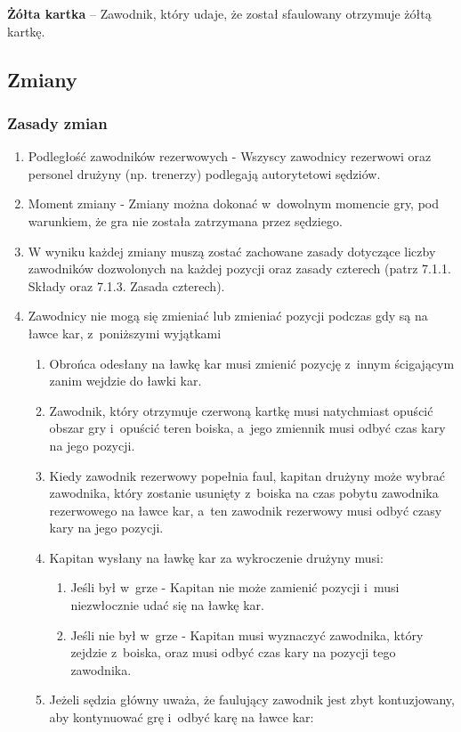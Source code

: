 \documentclass[12pt,a4paper]{article}
\newcommand\yellowcard[1]{\bgroup\textcolor{darkyellow}{\textbf{#1}}}
\begin{document}
\yellowcard{Żółta kartka} -- Zawodnik, który udaje, że został sfaulowany
otrzymuje żółtą kartkę.

\subsection{Zmiany}

\subsubsection{Zasady zmian}

\begin{enumerate}
	\item
	      Podległość zawodników rezerwowych - Wszyscy zawodnicy
	      rezerwowi oraz personel drużyny (np. trenerzy) podlegają autorytetowi
	      sędziów.
	\item
	      Moment zmiany - Zmiany można dokonać w~dowolnym momencie gry,
	      pod warunkiem, że gra nie została zatrzymana przez sędziego.
	\item
	      W wyniku każdej zmiany muszą zostać zachowane zasady dotyczące liczby
	      zawodników dozwolonych na każdej pozycji oraz zasady czterech (patrz
	      7.1.1. Składy oraz 7.1.3. Zasada czterech).
	\item
	      Zawodnicy nie mogą się zmieniać lub zmieniać pozycji podczas gdy są na
	      ławce kar, z~poniższymi wyjątkami

	      \begin{enumerate}
		      \item
		            Obrońca odesłany na ławkę kar musi zmienić pozycję z~innym
		            ścigającym zanim wejdzie do ławki kar.
		      \item
		            Zawodnik, który otrzymuje czerwoną kartkę musi natychmiast opuścić
		            obszar gry i~opuścić teren boiska, a~jego zmiennik musi odbyć czas
		            kary na jego pozycji.
		      \item
		            Kiedy zawodnik rezerwowy popełnia faul, kapitan drużyny może wybrać
		            zawodnika, który zostanie usunięty z~boiska na czas pobytu zawodnika
		            rezerwowego na ławce kar, a~ten zawodnik rezerwowy musi odbyć czasy
		            kary na jego pozycji.
		      \item
		            Kapitan wysłany na ławkę kar za wykroczenie drużyny musi:

		            \begin{enumerate}
			            \item
			                  Jeśli był w~grze - Kapitan nie może zamienić pozycji i~musi
			                  niezwłocznie udać się na ławkę kar.
			            \item
			                  Jeśli nie był w~grze - Kapitan musi wyznaczyć zawodnika, który
			                  zejdzie z~boiska, oraz musi odbyć czas kary na pozycji tego
			                  zawodnika.
		            \end{enumerate}
		      \item
		            Jeżeli sędzia główny uważa, że faulujący zawodnik jest zbyt
		            kontuzjowany, aby kontynuować grę i~odbyć karę na ławce kar:


\end{enumerate}
\end{enumerate}
\end{document}
